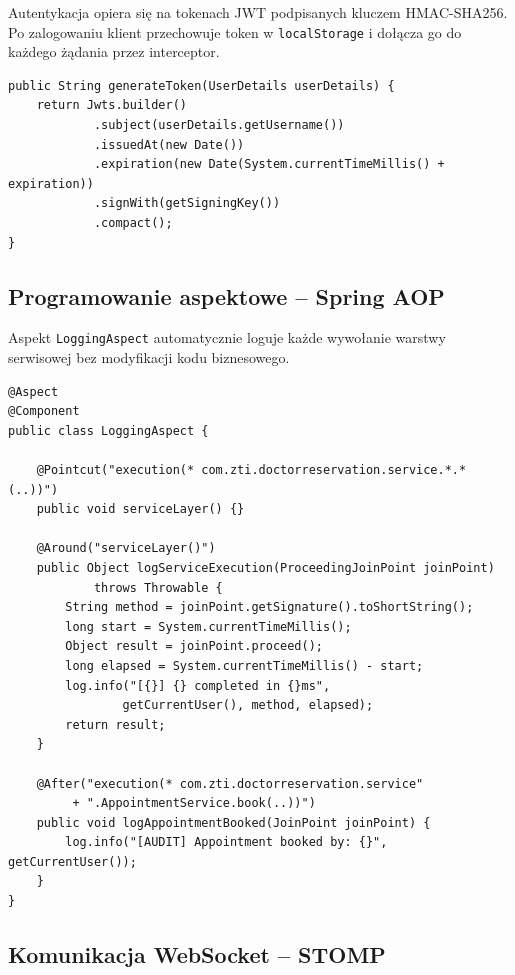 \documentclass[12pt, a4paper]{article}
\begin{document}
Autentykacja opiera się na tokenach JWT podpisanych kluczem HMAC-SHA256. Po zalogowaniu klient przechowuje token w \texttt{localStorage} i dołącza go do każdego żądania przez interceptor.

\begin{lstlisting}[style=java, caption={Generowanie tokenu JWT -- JwtUtil.java}]
public String generateToken(UserDetails userDetails) {
    return Jwts.builder()
            .subject(userDetails.getUsername())
            .issuedAt(new Date())
            .expiration(new Date(System.currentTimeMillis() + expiration))
            .signWith(getSigningKey())
            .compact();
}
\end{lstlisting}

\subsection{Programowanie aspektowe -- Spring AOP}

Aspekt \texttt{LoggingAspect} automatycznie loguje każde wywołanie warstwy serwisowej bez modyfikacji kodu biznesowego.

\begin{lstlisting}[style=java, caption={Aspekt logowania -- LoggingAspect.java}]
@Aspect
@Component
public class LoggingAspect {

    @Pointcut("execution(* com.zti.doctorreservation.service.*.*(..))")
    public void serviceLayer() {}

    @Around("serviceLayer()")
    public Object logServiceExecution(ProceedingJoinPoint joinPoint)
            throws Throwable {
        String method = joinPoint.getSignature().toShortString();
        long start = System.currentTimeMillis();
        Object result = joinPoint.proceed();
        long elapsed = System.currentTimeMillis() - start;
        log.info("[{}] {} completed in {}ms",
                getCurrentUser(), method, elapsed);
        return result;
    }

    @After("execution(* com.zti.doctorreservation.service"
         + ".AppointmentService.book(..))")
    public void logAppointmentBooked(JoinPoint joinPoint) {
        log.info("[AUDIT] Appointment booked by: {}", getCurrentUser());
    }
}
\end{lstlisting}

\subsection{Komunikacja WebSocket -- STOMP}
\end{document}
